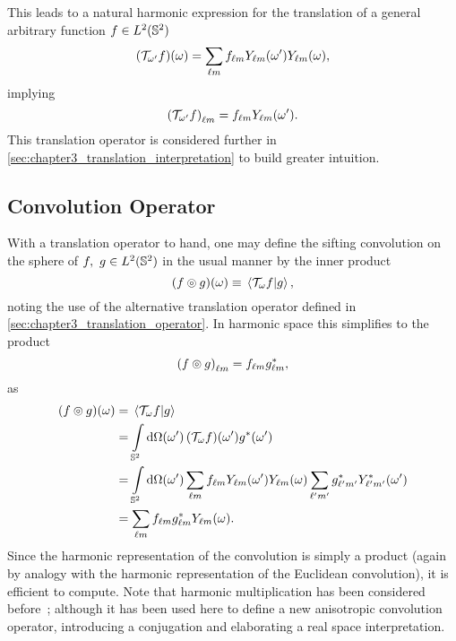This leads to a natural harmonic expression for the translation of a general arbitrary function \(f \in \hilbert{\twoSphere}\)
%
\begin{equation}\label{eq:chapter3_translation_real}
	\pixel{(\translation{\omega'}f)}
	= \harmonicSum \harmonic{f} \pixel[']{\harmonic{Y}} \pixel{\harmonic{Y}},
\end{equation}
%
implying
%
\begin{equation}\label{eq:chapter3_translation_harmonic}
	\harmonic{(\translation{\omega'}f)}
	= \harmonic{f} \pixel[']{\harmonic{Y}}.
\end{equation}
%
This translation operator is considered further in \cref{sec:chapter3_translation_interpretation} to build greater intuition.

\subsection{Convolution Operator}

With a translation operator to hand, one may define the sifting convolution on the sphere of \(f,\ g \in \hilbert{\twoSphere}\) in the usual manner by the inner product
%
\begin{equation}\label{eq:chapter3_convolution_real}
	\pixel{\convolution{f}{g}}
	\equiv \braket*{\translation{\omega}f}{g},
\end{equation}
%
noting the use of the alternative translation operator defined in \cref{sec:chapter3_translation_operator}.
In harmonic space this simplifies to the product
%
\begin{equation}\label{eq:chapter3_convolution_harmonic}
	\harmonic{\convolution{f}{g}}
	= \harmonic{f} \conj{\harmonic{g}},
\end{equation}
%
as
%
\begin{align}
	\pixel{(f \circledcirc g)}
	 & = \braket*{\translation{\omega}f}{g} \nonumber{}                                                                                                                                        \\
	 & = \integrateSphere{\omega'} \pixel[']{(\translation{\omega}f)} \pixel[']{\conj{g}} \nonumber{}                                                                                          \\
	 & = \integrateSphere{\omega'} \harmonicSum \harmonic{f} \pixel[']{\harmonic{Y}} \pixel{\harmonic{Y}} \harmonicSum['] \conj{\harmonic[']{g}} \pixel[']{\conj{\harmonic[']{Y}}} \nonumber{} \\
	 & = \harmonicSum \harmonic{f} \conj{\harmonic{g}} \pixel{\harmonic{Y}}.
\end{align}
%
Since the harmonic representation of the convolution is simply a product (again by analogy with the harmonic representation of the Euclidean convolution), it is efficient to compute.
Note that harmonic multiplication has been considered before~\autocite{Kennedy2011}; although it has been used here to define a new anisotropic convolution operator, introducing a conjugation and elaborating a real space interpretation.

